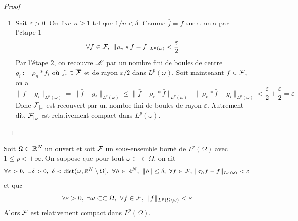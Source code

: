 \begin{proof}
\begin{enumerate}
        \item Soit $\varepsilon >0$. On fixe $n \geq 1$ tel que $1/n < \delta$. Comme $\bar{f}=f$ sur $\omega$ on a par l'étape $1$
        \begin{equation*}
            \forall f \in \calF, \ \|\rho_n*\bar{f}-f\|_{L^p(\omega)} < \frac{\varepsilon}{2}
        \end{equation*}
        Par l'étape $2$, on recouvre $\mathscr{K}$ par un nombre fini de boules de centre $g_i:=\rho_n*\bar{f}_i$ où $\bar{f}_i \in \overline{\mathcal{F}}$ et de rayon $\varepsilon/2$ dans $L^p(\omega)$. Soit maintenant $f \in \mathcal{F}$, on a 
        \begin{equation*}
            \|f-g_i\|_{L^p(\omega)}=\|\bar{f}-g_i\|_{L^p(\omega)} \leq \|\bar{f}-\rho_n*\bar{f}\|_{L^p(\omega)} + \|\rho_n*\bar{f}-g_i\|_{L^p(\omega)} < \frac{\varepsilon}{2}+\frac{\varepsilon}{2}=\varepsilon
        \end{equation*}
        Donc $\mathcal{F}_{|_{\omega}}$ est recouvert par un nombre fini de boules de rayon $\varepsilon$. Autrement dit, $\mathcal{F}_{|_{\omega}}$ est relativement compact dans $L^p(\omega)$.
    \end{enumerate}
\end{proof}

\begin{corollaire}\label{cor_Riesz_Frechet_Kolmogorov}
    Soit $\Omega \subset \mathbb{R}^N$ un ouvert et soit $\mathcal{F}$ un sous-ensemble borné de $L^p(\Omega)$ avec $1 \leq p <+\infty$. On suppose que pour tout $\omega \subset \subset \Omega$, on ait 
    \begin{equation*}
        \forall \varepsilon >0, \ \exists \delta >0, \ \delta < \mathrm{dist}(\omega, \mathbb{R}^N \setminus \Omega), \ \forall h \in \mathbb{R}^N, \ \|h\| \leq \delta, \ \forall f \in \mathcal{F}, \ \|\tau_hf-f\|_{L^p(\omega)} < \varepsilon
    \end{equation*}
    et que 
    \begin{equation*}
        \forall \varepsilon >0, \ \exists \omega \subset \subset \Omega, \ \forall f \in \mathcal{F}, \ \|f\|_{L^p(\Omega \setminus \omega)} < \varepsilon
    \end{equation*}
    Alors $\mathcal{F}$ est relativement compact dans $L^p(\Omega)$.
\end{corollaire}

